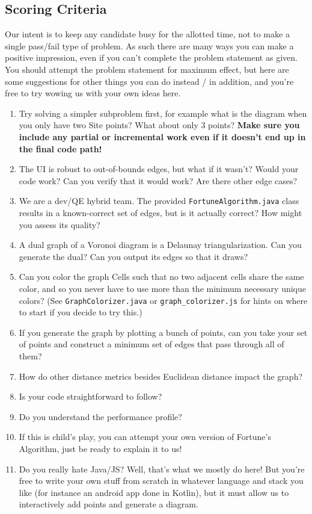 \documentclass[12pt]{article}
\begin{document}
\subsection*{Scoring Criteria}

Our intent is to keep any candidate busy for the allotted time, not to make a
single pass/fail type of problem. As such there are many ways you can make a
positive impression, even if you can't complete the problem statement as given.
You should attempt the problem statement for maximum effect, but here are some
suggestions for other things you can do instead / in addition, and you're free
to try wowing us with your own ideas here.

\newpage
\begin{enumerate}
  \item Try solving a simpler subproblem first, for example what is the diagram
    when you only have two Site points? What about only 3 points? \textbf{Make
    sure you include any partial or incremental work even if it doesn't end up in the final code
    path!}
  \item The UI is robust to out-of-bounds edges, but what if it wasn't? Would
    your code work? Can you verify that it would work? Are there other edge
    cases?
  \item We are a dev/QE hybrid team. The provided \texttt{FortuneAlgorithm.java}
    class results in a known-correct set of edges, but is it actually correct?
    How might you assess its quality?
  \item A dual graph of a Voronoi diagram is a Delaunay triangularization. Can
    you generate the dual? Can you output its edges so that it draws?
  \item Can you color the graph Cells such that no two adjacent cells share the
    same color, and so you never have to use more than the minimum necessary
    unique colors? (See \texttt{GraphColorizer.java} or
    \texttt{graph\_colorizer.js} for hints on where to start if you decide to
    try this.)
  \item If you generate the graph by plotting a bunch of points, can you take
    your set of points and construct a minimum set of edges that pass through
    all of them?
  \item How do other distance metrics besides Euclidean distance impact the
    graph?
  \item Is your code straightforward to follow?
  \item Do you understand the performance profile?
  \item If this is child's play, you can attempt your own version of Fortune's
    Algorithm, just be ready to explain it to us!
  \item Do you really hate Java/JS? Well, that's what we mostly do here! But
    you're free to write your own stuff from scratch in whatever language and
    stack you like (for instance an android app done in Kotlin), but it must
    allow us to interactively add points and generate a diagram.

\end{enumerate}
\end{document}
